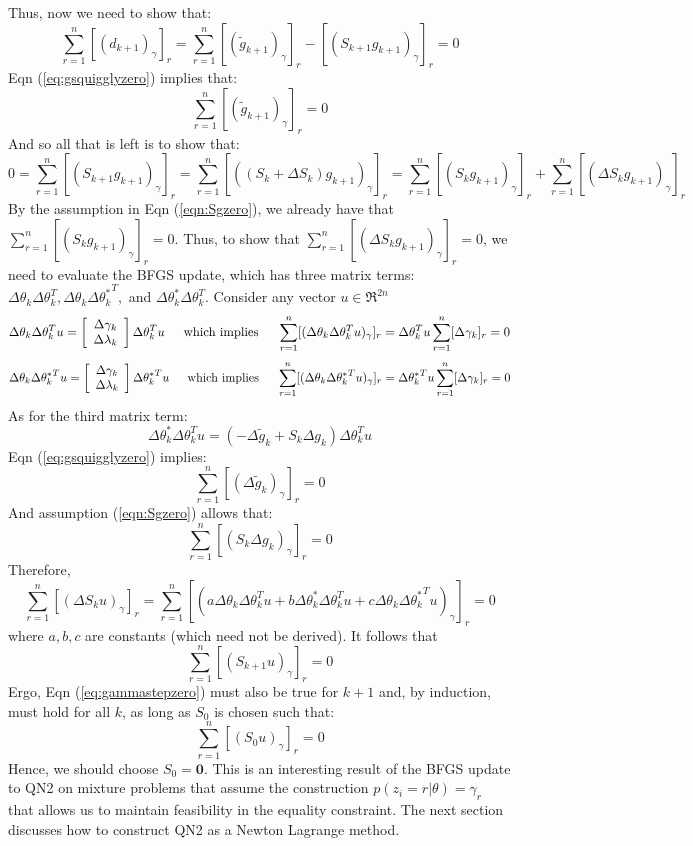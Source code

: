\documentclass[letter,12pt]{article}
\begin{document}
Thus, now we need to show that:
\begin{equation} \label{eq:dpluszero}
\sum_{r=1}^{n} [(d_{k+1})_{\gamma}]_r
=
\sum_{r=1}^{n} [(\tilde{g}_{k+1})_{\gamma}]_r - [(S_{k+1}g_{k+1})_{\gamma}]_r = 0
\end{equation}
Eqn (\ref{eq:gsquigglyzero}) implies that:
\[
\sum_{r=1}^{n} [(\tilde{g}_{k+1})_{\gamma}]_r = 0
\]
And so all that is left is to show that:
\[
0 = \sum_{r=1}^{n} [(S_{k+1}g_{k+1})_{\gamma}]_r 
= \sum_{r=1}^{n} [((S_{k}+\Delta S_k)g_{k+1})_{\gamma}]_r
=\sum_{r=1}^{n} [(S_{k}g_{k+1})_{\gamma}]_r
+\sum_{r=1}^{n} [(\Delta S_kg_{k+1})_{\gamma}]_r
\]
By the assumption in Eqn (\ref{eqn:Sgzero}), we already have that $\sum_{r=1}^{n} [(S_{k}g_{k+1})_{\gamma}]_r=0$.  Thus, to show that $\sum_{r=1}^{n} [(\Delta S_kg_{k+1})_{\gamma}]_r=0$, we need to evaluate the BFGS update, which has three matrix terms: $\Delta \theta_k \Delta \theta_k^T, \Delta \theta_k \Delta {\theta_k^*}^T,$ and $\Delta \theta_k^* \Delta \theta_k^T$.  Consider any vector $u \in \Re^{2n}$
\[
\Delta \theta_k\Delta \theta_k^Tu = 
\left[
\begin{array}{cc}
\Delta \gamma_k 
\\
\Delta \lambda_k 
\end{array}
\right]
\Delta \theta_k^Tu
\indent
\text{which implies}
\indent
\sum_{r=1}^{n} [(\Delta \theta_k\Delta \theta_k^Tu)_{\gamma}]_r 
=
\Delta \theta_k^Tu\sum_{r=1}^{n} [\Delta \gamma_k]_r
= 0
\]
\[
\Delta \theta_k \Delta {\theta_k^*}^Tu
=
\left[
\begin{array}{cc}
\Delta \gamma_k 
\\
\Delta \lambda_k 
\end{array}
\right]
\Delta {\theta_k^*}^Tu
\indent
\text{which implies}
\indent
\sum_{r=1}^{n} [(\Delta \theta_k\Delta {\theta_k^*}^Tu)_{\gamma}]_r 
=
\Delta {\theta_k^*}^Tu\sum_{r=1}^{n} [\Delta \gamma_k]_r
= 0
\]
As for the third matrix term:
\[
\Delta \theta_k^* \Delta \theta_k^Tu
=
(-\Delta\tilde{g}_k + S_k\Delta g_k)\Delta \theta_k^Tu
\]
Eqn (\ref{eq:gsquigglyzero}) implies:
\[
\sum_{r=1}^{n}[(\Delta\tilde{g}_k)_{\gamma}]_r = 0
\]
And assumption (\ref{eqn:Sgzero}) allows that:
\[
\sum_{r=1}^{n}[(S_k\Delta g_k)_{\gamma}]_r = 0
\]
Therefore,
\begin{equation} \label{eq:Suzero}
\sum_{r=1}^{n}[(\Delta S_ku)_{\gamma}]_r 
= \sum_{r=1}^{n}[(a\Delta \theta_k\Delta \theta_k^Tu + b\Delta \theta_k^* \Delta \theta_k^Tu + c\Delta \theta_k \Delta {\theta_k^*}^Tu)_{\gamma}]_r
= 0
\end{equation}
where $a,b,c$ are constants (which need not be derived).  It follows that
\[
\sum_{r=1}^{n}[(S_{k+1}u)_{\gamma}]_r = 0
\]
Ergo, Eqn (\ref{eq:gammastepzero}) must also be true for $k+1$ and, by induction, must hold for all $k$, as long as $S_0$ is chosen such that:
\[
\sum_{r=1}^{n}[(S_{0}u)_{\gamma}]_r = 0
\]
Hence, we should choose $S_0 = \boldsymbol{0}$.  This is an interesting result of the BFGS update to QN2 on mixture problems that assume the construction $p(z_i=r|\theta)=\gamma_r$ that allows us to maintain feasibility in the equality constraint.  The next section discusses how to construct QN2 as a Newton Lagrange method.
\end{document}
